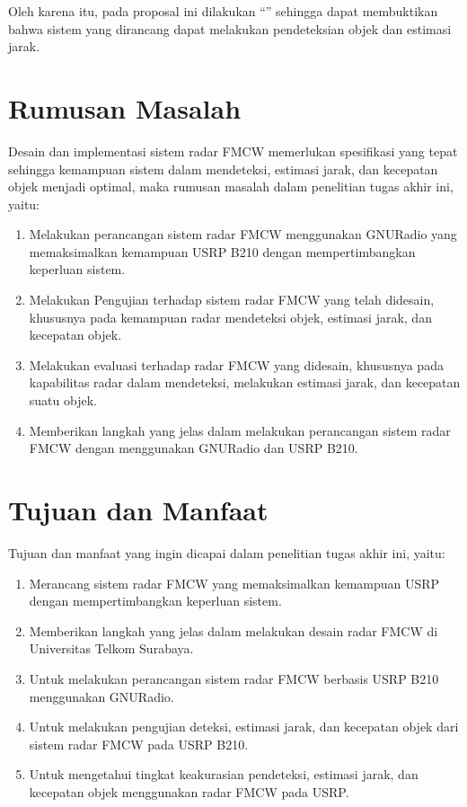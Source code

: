 Oleh karena itu, pada proposal ini dilakukan “\judul” sehingga dapat membuktikan bahwa sistem yang dirancang dapat melakukan pendeteksian objek dan estimasi jarak.

\section{Rumusan Masalah}
Desain dan implementasi sistem radar FMCW memerlukan spesifikasi yang tepat sehingga kemampuan sistem dalam mendeteksi, estimasi jarak, dan kecepatan objek menjadi optimal, maka rumusan masalah dalam penelitian tugas akhir ini, yaitu:
\begin{enumerate}
	\item Melakukan perancangan sistem radar FMCW menggunakan GNURadio yang memaksimalkan kemampuan USRP B210 dengan mempertimbangkan keperluan sistem.
	\item Melakukan Pengujian terhadap sistem radar FMCW yang telah didesain, khususnya pada kemampuan radar mendeteksi objek, estimasi jarak, dan kecepatan objek.
	\item Melakukan evaluasi terhadap radar FMCW yang didesain, khususnya pada kapabilitas radar dalam mendeteksi, melakukan estimasi jarak, dan kecepatan suatu objek.
	\item Memberikan langkah yang jelas dalam melakukan perancangan sistem radar FMCW dengan menggunakan GNURadio dan USRP B210.
\end{enumerate} 

\section{Tujuan dan Manfaat}
Tujuan dan manfaat yang ingin dicapai dalam penelitian tugas akhir ini, yaitu:

\begin{enumerate}
	\item Merancang sistem radar FMCW yang memaksimalkan kemampuan USRP dengan mempertimbangkan keperluan sistem.
	\item Memberikan langkah yang jelas dalam melakukan desain radar FMCW di Universitas Telkom Surabaya.
	\item Untuk melakukan perancangan sistem radar FMCW berbasis USRP B210 menggunakan GNURadio.
	\item Untuk melakukan pengujian deteksi, estimasi jarak, dan kecepatan objek dari sistem radar FMCW pada USRP B210.
	\item Untuk mengetahui tingkat keakurasian pendeteksi, estimasi jarak, dan kecepatan objek menggunakan radar FMCW pada USRP.
\end{enumerate}

